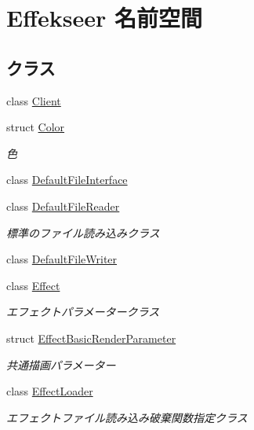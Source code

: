 \hypertarget{namespace_effekseer}{}\section{Effekseer 名前空間}
\label{namespace_effekseer}
\subsection*{クラス}
\begin{DoxyCompactItemize}
\item 
class \mbox{\hyperlink{class_effekseer_1_1_client}{Client}}
\item 
struct \mbox{\hyperlink{struct_effekseer_1_1_color}{Color}}
\begin{DoxyCompactList}\small\item\em 色 \end{DoxyCompactList}\item 
class \mbox{\hyperlink{class_effekseer_1_1_default_file_interface}{Default\+File\+Interface}}
\item 
class \mbox{\hyperlink{class_effekseer_1_1_default_file_reader}{Default\+File\+Reader}}
\begin{DoxyCompactList}\small\item\em 標準のファイル読み込みクラス \end{DoxyCompactList}\item 
class \mbox{\hyperlink{class_effekseer_1_1_default_file_writer}{Default\+File\+Writer}}
\item 
class \mbox{\hyperlink{class_effekseer_1_1_effect}{Effect}}
\begin{DoxyCompactList}\small\item\em エフェクトパラメータークラス \end{DoxyCompactList}\item 
struct \mbox{\hyperlink{struct_effekseer_1_1_effect_basic_render_parameter}{Effect\+Basic\+Render\+Parameter}}
\begin{DoxyCompactList}\small\item\em 共通描画パラメーター \end{DoxyCompactList}\item 
class \mbox{\hyperlink{class_effekseer_1_1_effect_loader}{Effect\+Loader}}
\begin{DoxyCompactList}\small\item\em エフェクトファイル読み込み破棄関数指定クラス \end{DoxyCompactList}\item 

\end{DoxyCompactItemize}
